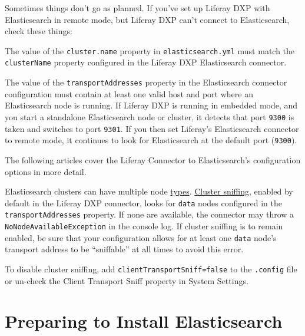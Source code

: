 Sometimes things don't go as planned. If you've set up Liferay DXP with
Elasticsearch in remote mode, but Liferay DXP can't connect to
Elasticsearch, check these things:

\begin{description}
\tightlist
\item[\textbf{Cluster name:}]
The value of the \texttt{cluster.name} property in
\texttt{elasticsearch.yml} must match the \texttt{clusterName} property
configured in the Liferay DXP Elasticsearch connector.
\item[\textbf{Transport address:}]
The value of the \texttt{transportAddresses} property in the
Elasticsearch connector configuration must contain at least one valid
host and port where an Elasticsearch node is running. If Liferay DXP is
running in embedded mode, and you start a standalone Elasticsearch node
or cluster, it detects that port \texttt{9300} is taken and switches to
port \texttt{9301}. If you then set Liferay's Elasticsearch connector to
remote mode, it continues to look for Elasticsearch at the default port
(\texttt{9300}).
\end{description}

The following articles cover the Liferay Connector to Elasticsearch's
configuration options in more detail.

\begin{description}
\tightlist
\item[\textbf{Cluster Sniffing (Additional Configurations):}]
Elasticsearch clusters can have multiple node
\href{https://www.elastic.co/guide/en/elasticsearch/reference/7.x/modules-node.html\#modules-node}{types}.
\href{https://www.elastic.co/guide/en/elasticsearch/client/java-api/7.x/transport-client.html}{Cluster
sniffing}, enabled by default in the Liferay DXP connector, looks for
\texttt{data} nodes configured in the \texttt{transportAddresses}
property. If none are available, the connector may throw a
\texttt{NoNodeAvailableException} in the console log. If cluster
sniffing is to remain enabled, be sure that your configuration allows
for at least one \texttt{data} node's transport address to be
``sniffable'' at all times to avoid this error.
\end{description}

To disable cluster sniffing, add \texttt{clientTransportSniff=false} to
the \texttt{.config} file or un-check the Client Transport Sniff
property in System Settings.

\chapter{Preparing to Install
Elasticsearch}\label{preparing-to-install-elasticsearch}

